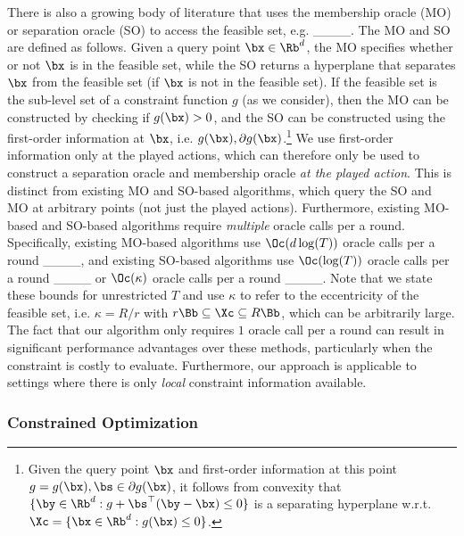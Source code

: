 There is also a growing body of literature that uses the membership oracle (MO) or separation oracle (SO) to access the feasible set, e.g. ____.
The MO and SO are defined as follows.
Given a query point $\bx \in \Rb^d$, the MO specifies whether or not $\bx$ is in the feasible set, while the SO returns a hyperplane that separates $\bx$ from the feasible set (if $\bx$ is not in the feasible set).
If the feasible set is the sub-level set of a constraint function $g$ (as we consider), then the MO can be constructed by checking if $g(\bx) > 0$, and the SO can be constructed using the first-order information at $\bx$, i.e. $g(\bx),\partial g(\bx)$.\footnote{Given the query point $\bx$ and first-order information at this point $g = g(\bx),\bs \in \partial g(\bx)$, it follows from convexity that $\{ \by \in \Rb^d : g + \bs^\top(\by - \bx) \leq 0\}$ is a separating hyperplane w.r.t. $\Xc = \{ \bx \in \Rb^d : g(\bx) \leq 0 \}$.}
We use first-order information only at the played actions, which can therefore only be used to construct a separation oracle and membership oracle \emph{at the played action}.
This is distinct from existing MO and SO-based algorithms, which query the SO and MO at arbitrary points (not just the played actions).
Furthermore, existing MO-based and SO-based algorithms require \emph{multiple} oracle calls per a round.
Specifically, existing MO-based algorithms use $\Oc(d \log(T))$ oracle calls per a round ____, and existing SO-based algorithms use $\Oc(\log(T))$ oracle calls per a round ____ or $\Oc(\kappa)$ oracle calls per a round ____.
Note that we state these bounds for unrestricted $T$ and use $\kappa$ to refer to the eccentricity of the feasible set, i.e. $\kappa = R/r$ with $r \Bb \subseteq \Xc \subseteq R \Bb$, which can be arbitrarily large.
The fact that our algorithm only requires $1$ oracle call per a round can result in significant performance advantages over these methods, particularly when the constraint is costly to evaluate.
Furthermore, our approach is applicable to settings where there is only \emph{local} constraint information available.

\subsubsection{Constrained Optimization}

